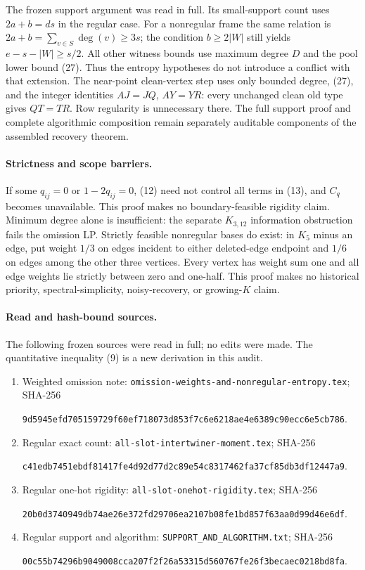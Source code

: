 \documentclass[11pt]{article}
\begin{document}
The frozen support argument was read in full. Its small-support
count uses $2a+b=ds$ in the regular case. For a nonregular frame the
same relation is $2a+b=\sum_{v\in S}\deg(v)\geq3s$; the condition
$b\geq2|W|$ still yields $e-s-|W|\geq s/2$. All other witness bounds
use maximum degree $D$ and the pool lower bound (27). Thus the
entropy hypotheses do not introduce a conflict with that extension.
The near-point clean-vertex step uses only bounded degree, (27),
and the integer identities $AJ=JQ$, $AY=YR$: every unchanged clean
old type gives $QT=TR$. Row regularity is unnecessary there.
The full support proof and complete algorithmic composition remain
separately auditable components of the assembled recovery theorem.

\paragraph{Strictness and scope barriers.}
If some $q_{ij}=0$ or $1-2q_{ij}=0$, (12) need not control all terms
in (13), and $C_q$ becomes unavailable. This proof makes no
boundary-feasible rigidity claim. Minimum degree alone is insufficient:
the separate $K_{3,12}$ information obstruction fails the omission
LP. Strictly feasible nonregular bases do exist: in $K_5$ minus an
edge, put weight $1/3$ on edges incident to either deleted-edge
endpoint and $1/6$ on edges among the other three vertices.
Every vertex has weight sum one and all edge weights lie strictly
between zero and one-half. This proof makes no historical priority,
spectral-simplicity, noisy-recovery, or growing-$K$ claim.

\paragraph{Read and hash-bound sources.}
The following frozen sources were read in full; no edits were made.
The quantitative inequality (9) is a new derivation in this audit.
\begin{enumerate}
\item Weighted omission note:
\texttt{omission-weights-and-nonregular-entropy.tex}; SHA-256
\par\noindent\texttt{9d5945efd705159729f60ef718073d853f7c6e6218ae4e6389c90ecc6e5cb786}.
\item Regular exact count:
\texttt{all-slot-intertwiner-moment.tex}; SHA-256
\par\noindent\texttt{c41edb7451ebdf81417fe4d92d77d2c89e54c8317462fa37cf85db3df12447a9}.
\item Regular one-hot rigidity:
\texttt{all-slot-onehot-rigidity.tex}; SHA-256
\par\noindent\texttt{20b0d3740949db74ae26e372fd29706ea2107b08fe1bd857f63aa0d99d46e6df}.
\item Regular support and algorithm:
\texttt{SUPPORT\_AND\_ALGORITHM.txt}; SHA-256
\par\noindent\texttt{00c55b74296b9049008cca207f2f26a53315d560767fe26f3becaec0218bd8fa}.
\end{enumerate}
\end{document}
